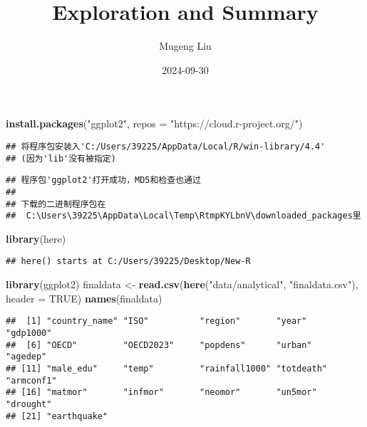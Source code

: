 \documentclass[
]{article}
\title{Exploration and Summary}
\author{Mugeng Liu}
\date{2024-09-30}
\newenvironment{Shaded}{\begin{snugshade}}{\end{snugshade}}
\newcommand{\AttributeTok}[1]{\textcolor[rgb]{0.13,0.29,0.53}{#1}}
\newcommand{\ConstantTok}[1]{\textcolor[rgb]{0.56,0.35,0.01}{#1}}
\newcommand{\FunctionTok}[1]{\textcolor[rgb]{0.13,0.29,0.53}{\textbf{#1}}}
\newcommand{\NormalTok}[1]{#1}
\newcommand{\OtherTok}[1]{\textcolor[rgb]{0.56,0.35,0.01}{#1}}
\newcommand{\StringTok}[1]{\textcolor[rgb]{0.31,0.60,0.02}{#1}}
\begin{document}
\maketitle

\begin{Shaded}
\begin{Highlighting}[]
\FunctionTok{install.packages}\NormalTok{(}\StringTok{"ggplot2"}\NormalTok{, }\AttributeTok{repos =} \StringTok{"https://cloud.r{-}project.org/"}\NormalTok{)}
\end{Highlighting}
\end{Shaded}

\begin{verbatim}
## 将程序包安装入'C:/Users/39225/AppData/Local/R/win-library/4.4'
## (因为'lib'没有被指定)
\end{verbatim}

\begin{verbatim}
## 程序包'ggplot2'打开成功，MD5和检查也通过
## 
## 下载的二进制程序包在
##  C:\Users\39225\AppData\Local\Temp\RtmpKYLbnV\downloaded_packages里
\end{verbatim}

\begin{Shaded}
\begin{Highlighting}[]
\FunctionTok{library}\NormalTok{(here)}
\end{Highlighting}
\end{Shaded}

\begin{verbatim}
## here() starts at C:/Users/39225/Desktop/New-R
\end{verbatim}

\begin{Shaded}
\begin{Highlighting}[]
\FunctionTok{library}\NormalTok{(ggplot2)}
\NormalTok{finaldata }\OtherTok{\textless{}{-}} \FunctionTok{read.csv}\NormalTok{(}\FunctionTok{here}\NormalTok{(}\StringTok{"data/analytical"}\NormalTok{, }\StringTok{"finaldata.csv"}\NormalTok{), }\AttributeTok{header =} \ConstantTok{TRUE}\NormalTok{)}
\FunctionTok{names}\NormalTok{(finaldata)}
\end{Highlighting}
\end{Shaded}

\begin{verbatim}
##  [1] "country_name" "ISO"          "region"       "year"         "gdp1000"     
##  [6] "OECD"         "OECD2023"     "popdens"      "urban"        "agedep"      
## [11] "male_edu"     "temp"         "rainfall1000" "totdeath"     "armconf1"    
## [16] "matmor"       "infmor"       "neomor"       "un5mor"       "drought"     
## [21] "earthquake"
\end{verbatim}
\end{document}
